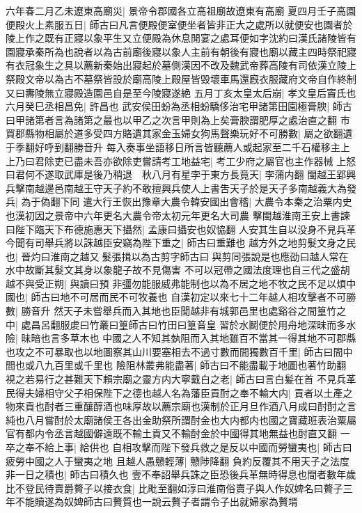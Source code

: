 六年春二月乙未遼東高廟災|{
	景帝令郡國各立高祖廟故遼東有高廟}
夏四月壬子高園便殿火上素服五日|{
	師古曰凡言便殿便室便坐者皆非正大之處所以就便安也園者於陵上作之既有正寢以象平生又立便殿為休息閒宴之處耳便如字沈約曰漢氏諸陵皆有園寢承秦所為也說者以為古前廟後寢以象人主前有朝後有寢也廟以藏主四時祭祀寢有衣冠象生之具以薦新秦始出寢起於墓側漢因不改及魏武帝葬高陵有司依漢立陵上祭殿文帝以為古不墓祭皆設於廟高陵上殿屋皆毁壞車馬還廐衣服藏府文帝自作終制又曰夀陵無立寢殿造園邑自是至今陵寢遂絶}
五月丁亥太皇太后崩|{
	孝文皇后竇氏也}
六月癸巳丞相昌免|{
	許昌也}
武安侯田蚡為丞相蚡驕侈治宅甲諸第田園極膏腴|{
	師古曰甲諸第者言為諸第之最也以甲乙之次言甲則為上矣膏腴謂肥厚之處治直之翻}
市買郡縣物相屬於道多受四方賂遺其家金玉婦女狗馬聲樂玩好不可勝數|{
	屬之欲翻遺于季翻好呼到翻勝音升}
每入奏事坐語移日所言皆聽薦人或起家至二千石權移主上上乃曰君除吏已盡未吾亦欲除吏嘗請考工地益宅|{
	考工少府之屬官也主作器械}
上怒曰君何不遂取武庫是後乃稍退　秋八月有星孛于東方長竟天|{
	孛蒲内翻}
閩越王郢興兵擊南越邊邑南越王守天子約不敢擅興兵使人上書吿天子於是天子多南越義大為發兵|{
	為于偽翻下同}
遣大行王恢出豫章大農令韓安國出會稽|{
	大農令本秦之治粟内史也漢初因之景帝中六年更名大農令帝太初元年更名大司農}
擊閩越淮南王安上書諫曰陛下臨天下布德施惠天下攝然|{
	孟康曰攝安也奴恊翻}
人安其生自以没身不見兵革今聞有司舉兵將以誅越臣安竊為陛下重之|{
	師古曰重難也}
越方外之地剪髮文身之民也|{
	晉灼曰淮南之越又髮張揖以為古剪字師古曰與剪同張說是也應劭曰越人常在水中故斷其髮文其身以象龍子故不見傷害}
不可以冠帶之國法度理也自三代之盛胡越不與受正朔|{
	與讀曰預}
非彊勿能服威弗能制也以為不居之地不牧之民不足以煩中國也|{
	師古曰地不可居而民不可牧養也}
自漢初定以來七十二年越人相攻擊者不可勝數|{
	勝音升}
然天子未嘗舉兵而入其地也臣聞越非有城郭邑里也處谿谷之間篁竹之中|{
	處昌呂翻服䖍曰竹叢曰篁師古曰竹田曰篁音皇}
習於水鬭便於用舟地深昧而多水險|{
	昧暗也言多草木也}
中國之人不知其埶阻而入其地雖百不當其一得其地不可郡縣也攻之不可暴取也以地圖察其山川要塞相去不過寸數而間獨數百千里|{
	師古曰間中間也或八九百里或千里也}
險阻林叢弗能盡著|{
	師古曰不能盡載于地圖也著竹助翻}
視之若易行之甚難天下賴宗廟之靈方内大寧戴白之老|{
	師古曰言白髪在首}
不見兵革民得夫婦相守父子相保陛下之德也越人名為藩臣貢酎之奉不輸大内|{
	貢者以土產之物來貢也酎者三重釀醇酒也味厚故以薦宗廟也漢制於正月旦作酒八月成曰酎酎之言純也八月嘗酎於太廟諸侯王各出金助祭所謂酎金也大内都内也國之寶藏班表治粟屬官有都内令丞言越國僻遠既不輸土貢又不輸酎金於中國得其地無益也酎直又翻}
一卒之奉不給上事|{
	給供也}
自相攻擊而陛下發兵救之是反以中國而勞蠻夷也|{
	師古曰疲勞中國之人于蠻夷之地}
且越人愚戇輕薄|{
	戇陟降翻}
負約反覆其不用天子之法度非一日之積也|{
	師古曰積久也}
壹不奉詔舉兵誅之臣恐後兵革無時得息也間者數年歲比不登民待賣爵贅子以接衣食|{
	比毗至翻如淳曰淮南俗賣子與人作奴婢名曰贅子三年不能贖遂為奴婢師古曰贅質也一說云贅子者謂令子出就婦家為贅壻}
